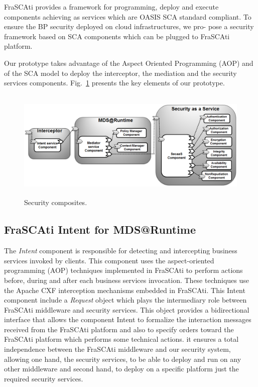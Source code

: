 \documentclass[runningheads,a4paper]{llncs}
\begin{document}
FraSCAti provides a framework for programming, deploy and execute components achieving as services which are OASIS SCA standard compliant. To ensure the BP security deployed on cloud infrastructures, we pro- pose a security framework based on SCA components which can be plugged to FraSCAti platform. 

Our prototype takes advantage of the Aspect Oriented Programming (AOP) and of the SCA model to deploy the interceptor, the mediation and the security services components. Fig.~\ref{fig:compoites} presents the key elements of our prototype.
 
\begin{figure}[ht]  
\centering
\includegraphics[height=150pt, width=350pt]{composites2.png}
\caption{Security composites.}
\label{fig:compoites}
\end{figure}


\subsection{FraSCAti Intent for MDS@Runtime}
 The \emph{Intent} component is responsible for detecting and intercepting business services invoked  by clients. This component uses the aspect-oriented programming (AOP) techniques implemented in FraSCAti to perform actions before, during and after each business services invocation. These techniques use the Apache CXF interception mechanisms embedded in FraSCAti. This Intent component include a \emph{Request} object which plays the intermediary role between FraSCAti middleware and security services. This object provides a bidirectional interface that allows the component Intent to formalize the interaction messages received from the FraSCAti platform and also to specify orders toward the FraSCAti platform which performs some technical actions. it ensures a total independence between the FraSCAti middleware and our security system, allowing one hand, the security services,  to be able to deploy and run on any other middleware and second hand, to deploy on a specific platform just the required security services.
\end{document}
